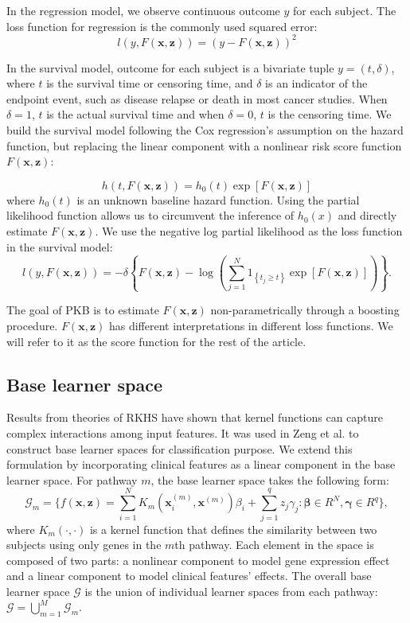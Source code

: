 \documentclass[a4paper,12pt]{article}
\newcommand{\bd}[1]{\mathbf{#1}}
\newcommand{\pathexpr}[3]{{#1}_{#2}^{(#3)}}
\begin{document}
	In the regression model, we observe continuous outcome $y$ for each subject. The loss function for regression is the commonly used squared error:
	$$l(y , F(\bd{x}, \bd{z}) ) = ( y - F(\bd{x}, \bd{z}))^2$$
	
	In the survival model, outcome for each subject is a bivariate tuple $y = (t, \delta)$, where $t$ is the survival time or censoring time, and $\delta$ is an indicator of the endpoint event, such as disease relapse or death in most cancer studies. When $\delta = 1$, $t$ is the actual survival time and when $\delta = 0$, $t$ is the censoring time. We build the survival model following the Cox regression's assumption on the hazard function, but replacing the linear component with a nonlinear risk score function $F(\bd{x}, \bd{z})$: \cite{li2005boosting}

	\begin{equation}
	\label{eqn:hazard}
	h(t, F(\bd{x},\bd{z}) ) = h_0(t)\exp[F(\bd{x},\bd{z})]
	\end{equation}
	where $h_0(t)$ is an unknown baseline hazard function. Using the partial likelihood function allows us to circumvent the inference of $h_0(x)$ and directly estimate $F(\bd{x}, \bd{z})$. We use the negative log partial likelihood\cite{li2005boosting} as the loss function in the survival model:
	$$l(y, F(\bd{x}, \bd{z}) ) = -\delta \left\lbrace F(\bd{x}, \bd{z}) - \log\left( \sum^{N}_{j=1}1_{\left\lbrace t_j \geq t\right\rbrace }\exp[F(\bd{x}, \bd{z})]\right)  \right\rbrace.$$
	
	The goal of PKB is to estimate $F(\bd{x}, \bd{z})$ non-parametrically through a boosting procedure. $F(\bd{x}, \bd{z})$ has different interpretations in different loss functions. We will refer to it as the score function for the rest of the article.
	\subsection{Base learner space}
	Results from theories of RKHS\cite{friedman2001elements} have shown that kernel functions can capture complex interactions among input features. It was used in Zeng et al.\citep{zeng2019pathway} to construct base learner spaces for classification purpose. We extend this formulation by incorporating clinical features as a linear component in the base learner space. For pathway $m$, the base learner space takes the following form:
	\begin{equation}
	\label{eqn:G}
	\mathcal{G}_m = \{  f(\bd{x}, \bd{z}) = \sum_{i=1}^N K_m(\pathexpr{\bd{x}}{i}{m}, \pathexpr{\bd{x} }{}{m}) \beta_i + \sum_{j=1}^q z_j \gamma_j : \mathbf{\beta} \in R^{N}, \mathbf{\gamma} \in R^{q} \},
	\end{equation}
	where $K_m(\cdot,\cdot)$ is a kernel function that defines the similarity between two subjects using only genes in the $m$th pathway. Each element in the space is composed of two parts: a nonlinear component to model gene expression effect and a linear component to model clinical features' effects. The overall base learner space $\mathcal{G}$ is the union of individual learner spaces from each pathway: $\mathcal{G} = \bigcup_{m=1}^M\mathcal{G}_m$.
	
\end{document}
